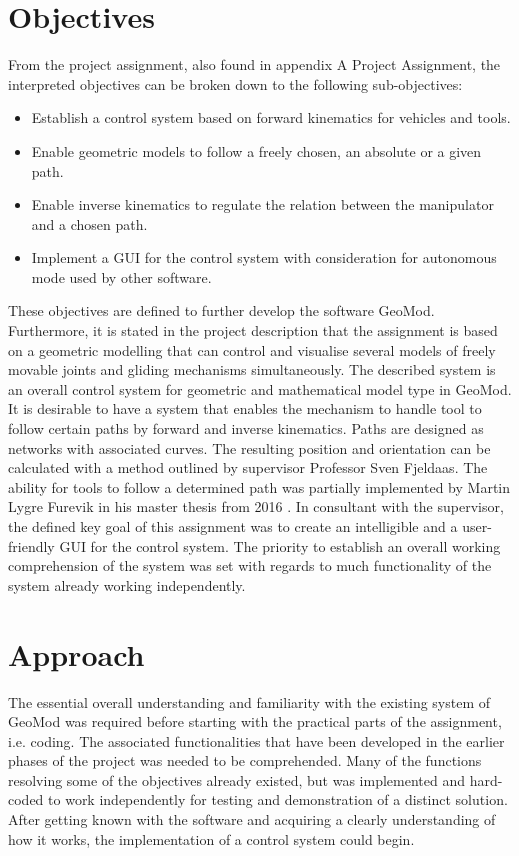 \section{Objectives}
\label{chap:objectives}

From the project assignment, also found in appendix A Project Assignment, the interpreted objectives can be broken down to the following sub-objectives:

\begin{itemize}
  \item Establish a control system based on forward kinematics for vehicles and tools.
  \item Enable geometric models to follow a freely chosen, an absolute or a given path.
  \item Enable inverse kinematics to regulate the relation between the manipulator and a chosen path.  
  \item Implement a GUI for the control system with consideration for autonomous mode used by other software.
\end{itemize}


\noindent These objectives are defined to further develop the software GeoMod. Furthermore, it is stated in the project description that the assignment is based on a geometric modelling that can control and visualise several models of freely movable joints and gliding mechanisms simultaneously. The described system is an overall control system for geometric and mathematical model type in GeoMod. It is desirable to have a system that enables the mechanism to handle tool to follow certain paths by forward and inverse kinematics. Paths are designed as networks with associated curves. The resulting position and orientation can be calculated with a method outlined by supervisor Professor Sven Fjeldaas. The ability for tools to follow a determined path was partially implemented by Martin Lygre Furevik in his master thesis from 2016 \cite{martin}. In consultant with the supervisor, the defined key goal of this assignment was to create an intelligible and a user-friendly GUI for the control system. The priority to establish an overall working comprehension of the system was set with regards to much functionality of the system already working independently.


\section{Approach}

The essential overall understanding and familiarity with the existing system of GeoMod was required before starting with the practical parts of the assignment, i.e. coding. The associated functionalities that have been developed in the earlier phases of the project was needed to be comprehended. Many of the functions resolving some of the objectives already existed, but was implemented and hard-coded to work independently for testing and demonstration of a distinct solution. After getting known with the software and acquiring a clearly understanding of how it works, the implementation of a control system could begin. 

